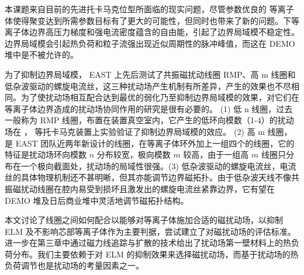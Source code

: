 \begin{cabstract}
  本课题来自目前的先进托卡马克位型所面临的现实问题，尽管参数优良的 \Hmode 等离子体使得聚变达到所需参数目标有了更大的可能性，但同时也带来了新的问题。\Hmode 下等离子体边界高压力梯度和强电流密度蕴含的自由能，引起了边界局域模不稳定性。边界局域模会引起热负荷和粒子流强出现近似周期性的脉冲峰值，而这在 DEMO 堆中是不被允许的。

  为了抑制边界局域模， EAST 上先后测试了共振磁扰动线圈 RMP、高 m 线圈和低杂波驱动的螺旋电流丝，这三种扰动场产生机制有所差异，产生的效果也不尽相同。为了使扰动场相互配合达到最优的弱化乃至抑制边界局域模的效果，对它们在等离子体边界造成的扰动场协同作用的研究是很有必要的。 (1) 低 n 线圈，过去一般称为 RMP 线圈，布置在装置真空室内，它产生的低环向模数（1-4）的扰动场在 \east， \ddd 等托卡马克装置上实验验证了抑制边界局域模的效应。 (2) 高 m 线圈，是 EAST 团队近两年新设计的线圈，在等离子体环外加上一组四个的线圈，它的特征是扰动场环向模数 $n$ 分布较宽，极向模数 $m$ 较高，由于一组高 $m$ 线圈只分布在一个极向截面处，扰动场的局域性很强。(3) 低杂波驱动的螺旋电流丝，电流丝的具体物理机制还不甚明晰，但其亦能调节边界磁拓扑。由于低杂波天线不像共振磁扰动线圈在腔内易受到损坏且激发出的螺旋电流丝紧靠边界，它有望在 DEMO 堆及日后商业堆中灵活地调节磁拓扑结构。
  
  本文讨论了线圈之间如何配合以能够对等离子体施加合适的磁扰动场，以抑制 ELM 及不影响芯部等离子体作为主要判据，尝试建立了对磁扰动场的评估标准。进一步在第三章中通过磁力线追踪与扩散的技术给出了扰动场第一壁材料上的热负荷分布。我们主要依赖于对 ELM 的抑制效果来选择磁扰动场，而基于扰动场的热负荷调节也是扰动场的考量因素之一。%

\end{cabstract}


